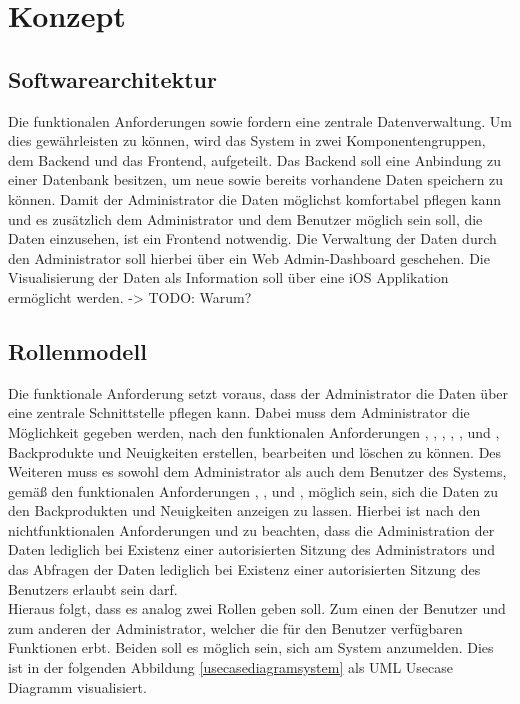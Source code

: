 \chapter{Konzept}

\section{Softwarearchitektur} \label{softwarearchitektur}
Die funktionalen Anforderungen  sowie  fordern eine zentrale Datenverwaltung.
Um dies gewährleisten zu können, wird das System in zwei Komponentengruppen, dem Backend und das Frontend, aufgeteilt.
Das Backend soll eine Anbindung zu einer Datenbank besitzen, um neue sowie bereits vorhandene Daten speichern zu können.
Damit der Administrator die Daten möglichst komfortabel pflegen kann und es zusätzlich dem Administrator und dem Benutzer möglich sein soll, die Daten einzusehen, ist ein Frontend notwendig. Die Verwaltung der Daten durch den Administrator soll hierbei über ein Web Admin-Dashboard geschehen. Die Visualisierung der Daten als Information soll über eine iOS Applikation ermöglicht werden. -> TODO: Warum?

\section{Rollenmodell}
Die funktionale Anforderung  setzt voraus, dass der Administrator die Daten über eine zentrale Schnittstelle pflegen kann. Dabei muss dem Administrator die Möglichkeit gegeben werden, nach den funktionalen Anforderungen , , , , , und , Backprodukte und Neuigkeiten erstellen, bearbeiten und löschen zu können.
Des Weiteren muss es sowohl dem Administrator als auch dem Benutzer des Systems, gemäß den funktionalen Anforderungen , ,  und , möglich sein, sich die Daten zu den Backprodukten und Neuigkeiten anzeigen zu lassen. Hierbei ist nach den nichtfunktionalen Anforderungen  und  zu beachten, dass die Administration der Daten lediglich bei Existenz einer autorisierten Sitzung des Administrators und das Abfragen der Daten lediglich bei Existenz einer autorisierten Sitzung des Benutzers erlaubt sein darf.
\\
Hieraus folgt, dass es analog zwei Rollen geben soll. Zum einen der Benutzer und zum anderen der Administrator, welcher die für den Benutzer verfügbaren Funktionen erbt. Beiden soll es möglich sein, sich am System anzumelden.
Dies ist in der folgenden Abbildung \ref{usecasediagramsystem} als UML Usecase Diagramm visualisiert.

